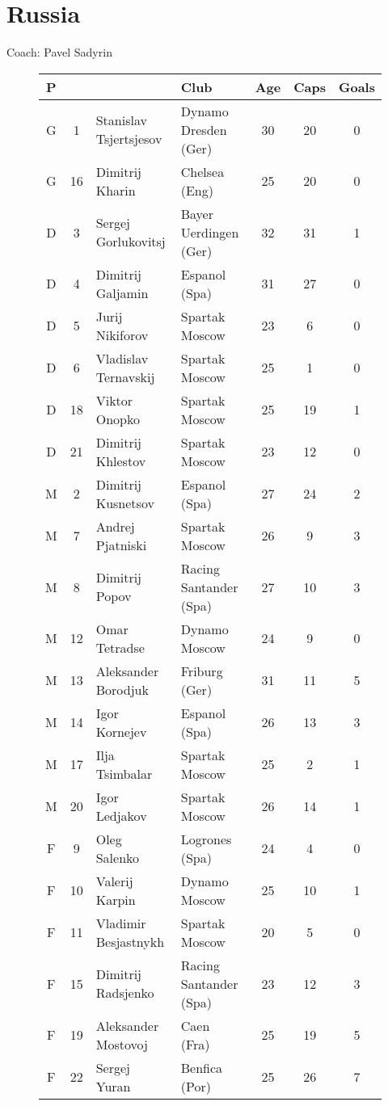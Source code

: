 \chapter{Russia}
\newline
\newline
Coach: Pavel Sadyrin
\begin{figure}[H]
\begin{tabular}{c c l l c c c}
P & & & Club & Age & Caps & Goals \\ \hline
G & 1 & Stanislav Tsjertsjesov & Dynamo Dresden (Ger) & 30 & 20 & 0 \\
G &16 & Dimitrij Kharin &  Chelsea (Eng) & 25 & 20 & 0 \\ \hline
D & 3 & Sergej Gorlukovitsj & Bayer Uerdingen (Ger) & 32 & 31 & 1 \\
D & 4 & Dimitrij Galjamin & Espanol (Spa) & 31 & 27 & 0 \\
D & 5 & Jurij Nikiforov & Spartak Moscow & 23 & 6 & 0 \\
D & 6 & Vladislav Ternavskij & Spartak Moscow & 25 & 1 & 0 \\
D &18 & Viktor Onopko & Spartak Moscow & 25 & 19 & 1 \\
D & 21 & Dimitrij Khlestov & Spartak Moscow & 23 & 12 & 0 \\ \hline
M & 2 & Dimitrij Kusnetsov & Espanol (Spa) & 27 & 24 & 2 \\
M & 7 & Andrej Pjatniski & Spartak Moscow & 26 & 9 & 3 \\
M & 8 & Dimitrij Popov & Racing Santander (Spa) & 27 & 10 & 3 \\
M &12 & Omar Tetradse & Dynamo Moscow & 24 & 9 & 0 \\
M &13 & Aleksander Borodjuk & Friburg (Ger) & 31 & 11 & 5 \\
M &14 & Igor Kornejev & Espanol (Spa) & 26 & 13 & 3 \\
M &17 & Ilja Tsimbalar & Spartak Moscow & 25 & 2 & 1 \\
M & 20 & Igor Ledjakov & Spartak Moscow & 26 & 14 & 1 \\ \hline
F & 9 & Oleg Salenko & Logrones (Spa) & 24 & 4 & 0 \\
F & 10 & Valerij Karpin & Dynamo Moscow & 25 & 10 & 1 \\
F & 11 & Vladimir Besjastnykh & Spartak Moscow & 20 & 5 & 0 \\
F & 15 & Dimitrij Radsjenko & Racing Santander (Spa) & 23 & 12 & 3 \\
F & 19 & Aleksander Mostovoj & Caen (Fra) & 25 & 19 & 5 \\
F & 22 & Sergej Yuran & Benfica (Por) & 25 & 26 & 7 \\ \hline
\end{tabular}
\end{figure}
